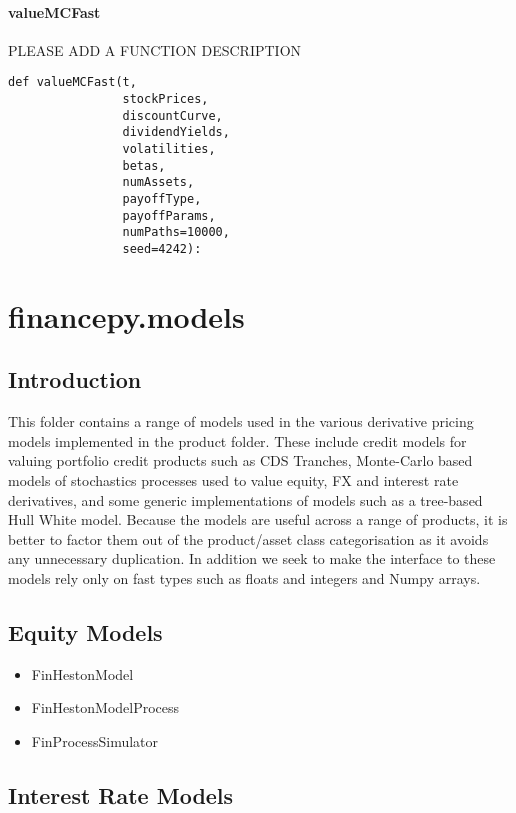 \documentclass[twoside,11pt]{book}
\begin{document}
\subsubsection*{{\bf valueMCFast}}
PLEASE ADD A FUNCTION DESCRIPTION

\begin{lstlisting}
def valueMCFast(t,
                stockPrices,
                discountCurve,
                dividendYields,
                volatilities,
                betas,
                numAssets,
                payoffType,
                payoffParams,
                numPaths=10000,
                seed=4242):
\end{lstlisting}


\chapter{financepy.models}
\section{Introduction}

This folder contains a range of models used in the various derivative pricing models implemented in the product folder. These include credit models for valuing portfolio credit products such as CDS Tranches, Monte-Carlo based models of stochastics processes used to value equity, FX and interest rate derivatives, and some generic implementations of models such as a tree-based Hull White model. Because the models are useful across a range of products, it is better to factor them out of the product/asset class categorisation as it avoids any unnecessary duplication. In addition we seek to make the interface to these models rely only on fast types such as floats and integers and Numpy arrays.


\section*{Equity Models}
\begin{itemize}
\item{ FinHestonModel 
}
\item{ FinHestonModelProcess
}
\item{ FinProcessSimulator
}
\end{itemize}


\section*{Interest Rate Models}
\end{document}
